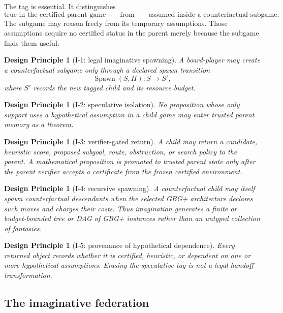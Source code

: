 \documentclass[11pt]{article}
\newtheorem{principle}[definition]{Design Principle}
\begin{document}
The tag is essential.  It distinguishes
\[
\text{true in the certified parent game}
\qquad\text{from}\qquad
\text{assumed inside a counterfactual subgame}.
\]
The subgame may reason freely from its temporary assumptions.  Those assumptions acquire no certified status in the parent merely because the subgame finds them useful.

\begin{principle}[I-1: legal imaginative spawning]
A board-player may create a counterfactual subgame only through a declared spawn transition
\[
\operatorname{Spawn}(S,H):S\longrightarrow S',
\]
where $S'$ records the new tagged child and its resource budget.
\end{principle}

\begin{principle}[I-2: speculative isolation]
No proposition whose only support uses a hypothetical assumption in a child game may enter trusted parent memory as a theorem.
\end{principle}

\begin{principle}[I-3: verifier-gated return]
A child may return a candidate, heuristic score, proposed subgoal, route, obstruction, or search policy to the parent.  A mathematical proposition is promoted to trusted parent state only after the parent verifier accepts a certificate from the frozen certified environment.
\end{principle}

\begin{principle}[I-4: recursive spawning]
A counterfactual child may itself spawn counterfactual descendants when the selected GBG+ architecture declares such moves and charges their costs.  Thus imagination generates a finite or budget-bounded tree or DAG of GBG+ instances rather than an untyped collection of fantasies.
\end{principle}

\begin{principle}[I-5: provenance of hypothetical dependence]
Every returned object records whether it is certified, heuristic, or dependent on one or more hypothetical assumptions.  Erasing the speculative tag is not a legal handoff transformation.
\end{principle}

\subsection{The imaginative federation}
\end{document}
